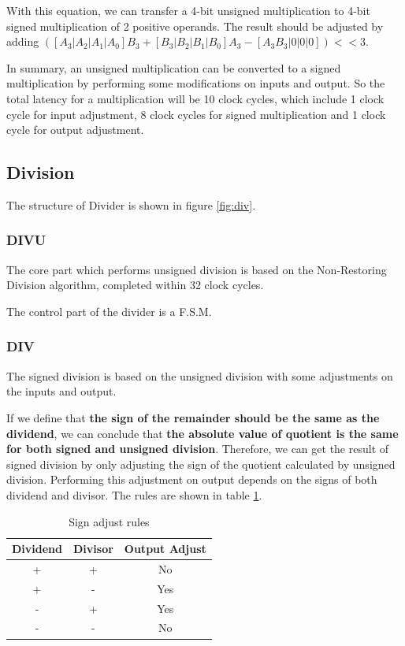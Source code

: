 With this equation, we can transfer a 4-bit unsigned multiplication to 4-bit signed multiplication
of 2 positive operands. The result should be adjusted by adding $([A_3|A_2|A_1|A_0]B_3+[B_3|B_2|B_1|B_0]A_3-[A_3B_3|0|0|0]) << 3$.

In summary, an unsigned multiplication can be converted to a signed multiplication by
performing some modifications on inputs and output. So the total latency for a multiplication
will be 10 clock cycles, which include 1 clock cycle for input adjustment, 8 clock cycles
for signed multiplication and 1 clock cycle for output adjustment.

\subsection[Division]{Division}
The structure of Divider is shown in figure \ref{fig:div}.

\subsubsection[DIVU]{DIVU}
The core part which performs unsigned division is based on the
Non-Restoring Division algorithm, completed within 32 clock cycles.

The control part of the divider is a F.S.M.

\subsubsection[DIV]{DIV}
The signed division is based on the unsigned division with some adjustments on the inputs
and output.

If we define that {\bf the sign of the remainder should be the same as the dividend},
we can conclude that {\bf the absolute value of quotient is the same for both signed and
unsigned division}. Therefore, we can get the result of signed division by only adjusting
the sign of the quotient calculated by unsigned division. Performing this
adjustment on output depends on the signs of both dividend and divisor. The rules
are shown in table \ref{tab:div_sign}.

\begin{table}[!ht]
\centering
\caption{Sign adjust rules}
\label{tab:div_sign}
\begin{tabular}{|c|c|c|}
\hline
Dividend & Divisor & Output Adjust\\
\hline
+ & + & No\\
+ & - & Yes\\
- & + & Yes\\
- & - & No\\
\hline
\end{tabular}
\end{table}

